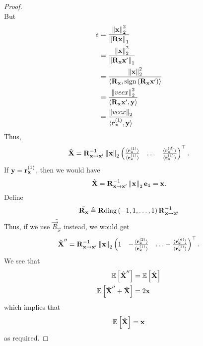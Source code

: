 \documentclass[twoside]{article}
\begin{document}
\begin{proof}
\begin{equation}
    \end{equation}
    But
    \begin{align}
        s &= \frac{\left\lVert\boldsymbol{\mathbf{x}}\right\rVert_2^2}{\left\lVert\boldsymbol{\mathbf{Rx}}\right\rVert_1} \\
          &= \frac{\left\lVert\boldsymbol{\mathbf{x}}\right\rVert_2^2}{\left\lVert\boldsymbol{\mathbf{R}}_{\boldsymbol{\mathbf{x}}}\boldsymbol{\mathbf{x}}^\prime\right\rVert_1} \\
          &= \frac{\left\lVert\boldsymbol{\mathbf{x}}\right\rVert_2^2}{\langle\boldsymbol{\mathbf{R}}_{\boldsymbol{\mathbf{x}}},\mathrm{sign}\left(\boldsymbol{\mathbf{R}}_{\boldsymbol{\mathbf{x}}}\boldsymbol{\mathbf{x}}^\prime\right)\rangle} \\
          &= \frac{\left\lVert vec{x}\right\rVert_2^2}{\langle\boldsymbol{\mathbf{R}}_{\boldsymbol{\mathbf{x}}}\boldsymbol{\mathbf{x}}^\prime,\boldsymbol{\mathbf{y}}\rangle} \\
          &= \frac{\left\lVert vec{x}\right\rVert_2}{\langle\boldsymbol{\mathbf{r}}_{\boldsymbol{\mathbf{x}}}^{\left(1\right)},\boldsymbol{\mathbf{y}}\rangle}
    \end{align}
    Thus,
    \begin{equation}
        \hat{\boldsymbol{\mathbf{X}}} = \boldsymbol{\mathbf{R}}_{\boldsymbol{\mathbf{x}}\rightarrow\boldsymbol{\mathbf{x}}^\prime}^{-1}\left\lVert\boldsymbol{\mathbf{x}}\right\rVert_2\begin{pmatrix}\frac{\langle\boldsymbol{\mathbf{r}}_{\boldsymbol{\mathbf{x}}}^{\left(1\right)}\rangle}{\langle\boldsymbol{\mathbf{r}}_{\boldsymbol{\mathbf{x}}}^{\left(1\right)}\rangle} & \ldots & \frac{\langle\boldsymbol{\mathbf{r}}_{\boldsymbol{\mathbf{x}}}^{\left(d\right)}\rangle}{\langle\boldsymbol{\mathbf{r}}_{\boldsymbol{\mathbf{x}}}^{\left(1\right)}\rangle}\end{pmatrix}^\top.
    \end{equation}
    If \(\boldsymbol{\mathbf{y}} = \boldsymbol{\mathbf{r}}_{\boldsymbol{\mathbf{x}}}^{\left(1\right)}\), then we would have 
    \begin{equation}
        \hat{\boldsymbol{\mathbf{X}}} = \boldsymbol{\mathbf{R}}_{\boldsymbol{\mathbf{x}}\rightarrow\boldsymbol{\mathbf{x}}^\prime}^{-1}\left\lVert\boldsymbol{\mathbf{x}}\right\rVert_2\boldsymbol{\mathbf{e_1}} = \boldsymbol{\mathbf{x}}.
    \end{equation}
    Define
    \begin{equation}
        \bar{\vec{R}_{\vec{x}}} \triangleq \vec{R}\mathrm{diag}\brak{-1, 1, \ldots, 1}\vec{R}_{\vec{x}\rightarrow\vec{x}^\prime}^{-1}
        \label{eq:Rxbar-def}
    \end{equation}
    Thus, if we use \(\bar{\vec{R}_{\vec{x}}}\) instead, we would get
    \begin{equation}
        \hat{\vec{X}}^{\prime\prime} = \vec{R}_{\vec{x}\rightarrow\vec{x}^\prime}^{-1}\norm{\vec{x}}_2\myvec{1 & -\frac{\langle\vec{r}_{\vec{x}}^{\brak{2}}\rangle}{\langle\vec{r}_{\vec{x}}^{\brak{1}}\rangle} & \ldots -\frac{\langle\vec{r}_{\vec{x}}^{\brak{d}}\rangle}{\langle\vec{r}_{\vec{x}}^{\brak{1}}\rangle}}^\top.
        \label{eq:Xhat-dpr-def}
    \end{equation}
    We see that
    \begin{align}
        \mathbb{E}\left[ \hat{\boldsymbol{\mathbf{X}}}^{\prime\prime} \right] &= \mathbb{E}\left[ \hat{\boldsymbol{\mathbf{X}}} \right] \\
        \mathbb{E}\left[ \hat{\boldsymbol{\mathbf{X}}}^{\prime\prime}+\hat{\boldsymbol{\mathbf{X}}} \right] &= 2\boldsymbol{\mathbf{x}}
    \end{align}
    which implies that
    \begin{equation}
        \mathbb{E}\left[ \hat{\boldsymbol{\mathbf{X}}} \right] = \boldsymbol{\mathbf{x}}
    \end{equation}
    as required.
\end{proof}
\end{document}
